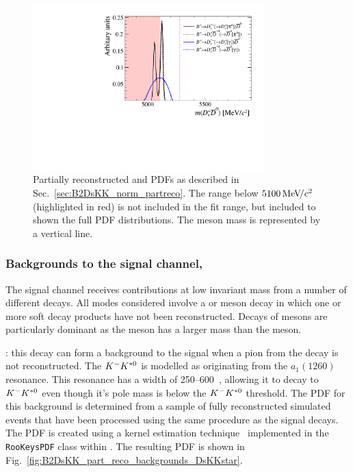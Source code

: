 \begin{figure}[!h]
    \centering
    \includegraphics[width=0.80\textwidth]{figs/B2DsKK/B2DsKK_DsD0_part_reco_Shapes.pdf}
    \caption{Partially reconstructed \decay{\Bp}{\Dssp\Dzb} and \decay{\Bp}{\Dsp\Dstarzb} PDFs as described in Sec.~\ref{sec:B2DsKK_norm_partreco}. The range below $5100{\mathrm{\,Me\kern -0.1em V\!/}c^2}$ (highlighted in red) is not included in the fit range, but included to shown the full PDF distributions. The \Bp meson mass is represented by a vertical line.} 
    \label{fig:B2DsKK_DsD0_partreco}   
\end{figure}





\subsubsection{Backgrounds to the signal channel, \decay{\Bp}{\Dsp\Kp\Km}}
\label{sec:B2DsKK_sig_partreco}
The signal channel receives contributions at low invariant mass from a number of different decays. 
All modes considered involve a \Bs or \Bz meson decay in which one or more soft decay products have not been reconstructed.
Decays of \Bs mesons are particularly dominant as the \Bs meson has a larger mass than the \Bp meson.   

\begin{description}
\item \decay{\Bsb}{\Dsp\Km\Kstarz}: this decay can form a background to the \decay{\Bp}{\Dsp\Kp\Km} signal when a pion from the \decay{\Kstarz}{\Kp\pim} decay is not reconstructed. The ${{K}^-}{{K}^{*0}}$ is modelled as originating from the $a_1(1260)$ resonance. This resonance has a width of 250--600\mevcc~\cite{PDG2016}, allowing it to decay to ${{K}^-}{{K}^{*0}}$ even though it's pole mass is below the ${{K}^-}{{K}^{*0}}$ threshold.
The PDF for this background is determined from a sample of fully reconstructed simulated events that have been processed using the same procedure as the signal decays. The PDF is created using a kernel estimation technique~\cite{Cranmer:2000du} implemented in the \texttt{RooKeysPDF} class within \roofit. The resulting PDF is shown in Fig.~\ref{fig:B2DsKK_part_reco_backgrounds_DsKKstar}.
\end{description}


